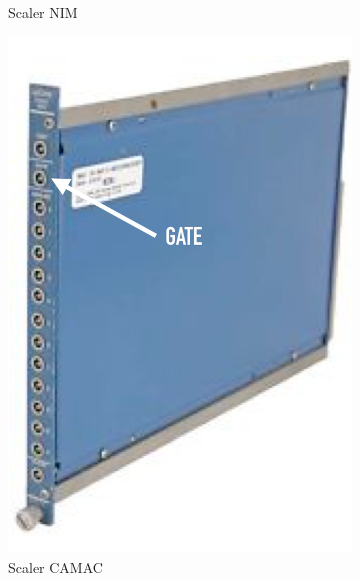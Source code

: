 \begin{figure}
\begin{subfigure}[t]{0.2\textwidth}
        \caption{Scaler NIM}
        \label{fig:scaler1}
    \end{subfigure}
    \hfill
    \begin{subfigure}[t]{0.25\textwidth}
        \includegraphics[height=0.25\textheight, width=\textwidth, keepaspectratio]{figures/gate.png}
        \caption{Scaler CAMAC}
        \label{fig:scaler2}
    \end{subfigure}    
    \hfill
    \begin{subfigure}[t]{0.45\textwidth}

\end{subfigure}
\end{figure}
